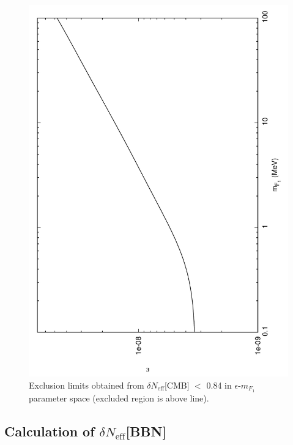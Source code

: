 \documentclass[12pt]{article}
\begin{document}
\begin{figure}[htpb]
    \centering
        \includegraphics[scale=0.5, angle=270]{fig9}
    \caption{Exclusion limits obtained from $\delta N _{\text{eff}}$[CMB] $<$ 0.84 in $\epsilon$-$m_{F_1}$ parameter space (excluded region is above line).}
    \label{fig:Exclusion cmb}
\end{figure}
%
\newpage
%
\subsection{Calculation of $\delta N _{\text{eff}}$[BBN]}
\end{document}
